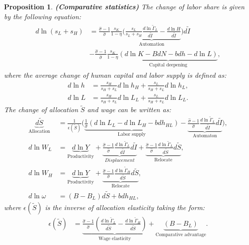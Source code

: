 \documentclass[12pt]{article}
\newtheorem{proposition}{Proposition}
\begin{document}
\begin{proposition}{\bf (Comparative statistics)}
The change of labor share is given by the following equation: 
\begin{align}
\label{ds_L}
\begin{split}
d\ln(s_{L}+s_{H}) &= \frac{\hat{\sigma}-1}{\hat{\sigma}}\frac{s_K}{1-\eta}\underbrace{( \frac{s_L}{s_L+s_H}\frac{d\ln\tilde{\Gamma}_L}{d\tilde{I}}-\frac{d\ln H}{d\tilde{I}}}_{\text{Automation}})d\tilde{I}\\
&-\frac{\hat{\sigma}-1}{\hat{\sigma}}\frac{s_K}{1-\eta}\underbrace{(d\ln K -BdN-bdh-d\ln L)}_{\text{Capital deepening}},
 \end{split}
\end{align}
where the average change of human capital and labor supply is defined as: 
\begin{align*}
d\ln h &= \frac{s_H}{s_H+s_L}d\ln h_H+\frac{s_L}{s_H+s_L}d\ln h_L,\\
d\ln L &= \frac{s_H}{s_H+s_L}d\ln L_L+\frac{s_L}{s_H+s_L}d\ln L_L.
\end{align*}
The change of allocation $\tilde{S}$ and wage can be written as: 
\begin{align}
\label{dS}
\underbrace{d\tilde{S}}_{\text{Allocation}} &= \frac{1}{\epsilon(\tilde{S})}\Big(\underbrace{\frac{1}{\hat{\sigma}}(d\ln L_L-d\ln L_H-bdh_{HL})}_{\text{Labor supply}}-\underbrace{\frac{\hat{\sigma}-1}{\hat{\sigma}}\frac{d\ln\tilde{\Gamma}_L}{d\tilde{I}}d\tilde{I}}_{\text{Automaton}}\Big),\\ 
\label{dW_L}
d \ln W_L &= \underbrace{d \ln Y}_{\text{Productivity}} + \underbrace{\frac{\hat{\sigma}-1}{\hat{\sigma}}\frac{d\ln\tilde{\Gamma}_L}{d\tilde{I}}d\tilde{I}}_{Displacement}+ \underbrace{\frac{\hat{\sigma}-1}{\hat{\sigma}}\frac{d\ln\tilde{\Gamma}_L}{d\tilde{S}}d\tilde{S}}_{\text{Relocate}},\\
\label{dW_H}
d \ln W_H &= \underbrace{d \ln Y}_{\text{Productivity}}  + \underbrace{\frac{\hat{\sigma}-1}{\hat{\sigma}}\frac{d\ln\tilde{\Gamma}_H}{d\tilde{S}}d\tilde{S}}_{\text{Relocate}}, \\
\label{dw}
d \ln \omega &=(B-B_L)d\tilde{S}+bdh_{HL},
\end{align}
where $\epsilon(\tilde{S})$ is the inverse of allocation elasticity taking the form:  
\begin{align}
\label{eS}
\epsilon(\tilde{S})&= \underbrace{\frac{\hat{\sigma}-1}{\hat{\sigma}}(\frac{d\ln \tilde{\Gamma}_L}{d\tilde{S}}-\frac{d\ln \tilde{\Gamma}_H}{d\tilde{S}})}_{\text{Wage elasticity}}
								 +\underbrace{(B-B_L)}_{\text{Comparative advantage}}.
\end{align}
\end{proposition}
\end{document}
